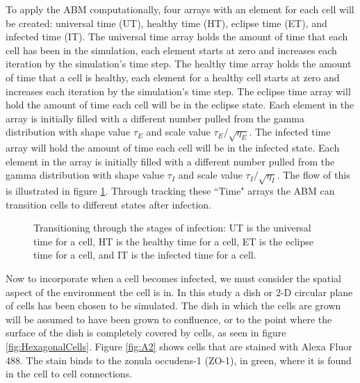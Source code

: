 \documentclass[a4paper]{article}
\begin{document}
To apply the ABM computationally, four arrays with an element for each cell will be created: universal time (UT), healthy time (HT), eclipse time (ET), and infected time (IT). The universal time array holds the amount of time that each cell has been in the simulation, each element starts at zero and increases each iteration by the simulation's time step. The healthy time array holds the amount of time that a cell is healthy, each element for a healthy cell starts at zero and increases each iteration by the simulation's time step. The eclipse time array will hold the amount of time each cell will be in the eclipse state. Each element in the array is initially filled with a different number pulled from the gamma distribution with shape value $\tau_E$ and scale value $\tau_E/\sqrt{\eta_E}$. The infected time array will hold the amount of time each cell will be in the infected state. Each element in the array is initially filled with a different number pulled from the gamma distribution with shape value $\tau_I$ and scale value $\tau_I/\sqrt{\eta_I}$. The flow of this is illustrated in figure \ref{fig:transitioning_through_the_stages_of_infection}. Through tracking these ``Time" arrays the ABM can transition cells to different states after infection.

\begin{figure}[h]
    \centering
    \caption{Transitioning through the stages of infection: UT is the universal time for a cell, HT is the healthy time for a cell, ET is the eclipse time for a cell, and IT is the infected time for a cell.}
    \label{fig:transitioning_through_the_stages_of_infection}
\end{figure}

Now to incorporate when a cell becomes infected, we must consider the spatial aspect of the environment the cell is in. In this study a dish or 2-D circular plane of cells has been chosen to be simulated. The dish in which the cells are grown will be assumed to have been grown to confluence, or to the point where the surface of the dish is completely covered by cells, as seen in figure \ref{fig:HexagonalCells}. Figure \ref{fig:A2} shows cells that are stained with Alexa Fluor 488. The stain binds to the zonula occudens-1 (ZO-1), in green, where it is found in the cell to cell connections.
%
\end{document}
